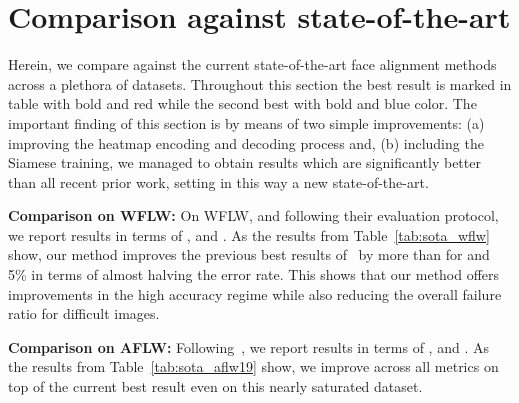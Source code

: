\documentclass{bmvc2k}
\begin{document}
\vspace{-0.3cm}
\section{Comparison against state-of-the-art}\label{sec:sota}

Herein, we compare against the current state-of-the-art face alignment methods across a plethora of datasets. Throughout this section the best result is marked in table with bold and red while the second best with bold and blue color. The important finding of this section is by means of two simple improvements: (a) improving the heatmap encoding and decoding process and, (b) including the Siamese training, we managed to obtain results which are significantly better than all recent prior work, setting in this way a new state-of-the-art.


\noindent \textbf{Comparison on WFLW:} On WFLW, and following their evaluation protocol, we report results in terms of ,  and . As the results from Table~\ref{tab:sota_wflw} show, our method improves the previous best results of~\cite{kumar2020luvli} by more than  for  and 5\%  in terms of  almost halving the error rate. This shows that our method  offers improvements in the high accuracy regime while also reducing the overall failure ratio for difficult images. 

\noindent \textbf{Comparison on AFLW:} Following~\cite{kumar2020luvli}, we report results in terms of  ,  and . As the results from Table~\ref{tab:sota_aflw19} show, we improve across all metrics on top of the current best result even on this nearly saturated dataset.
\end{document}
